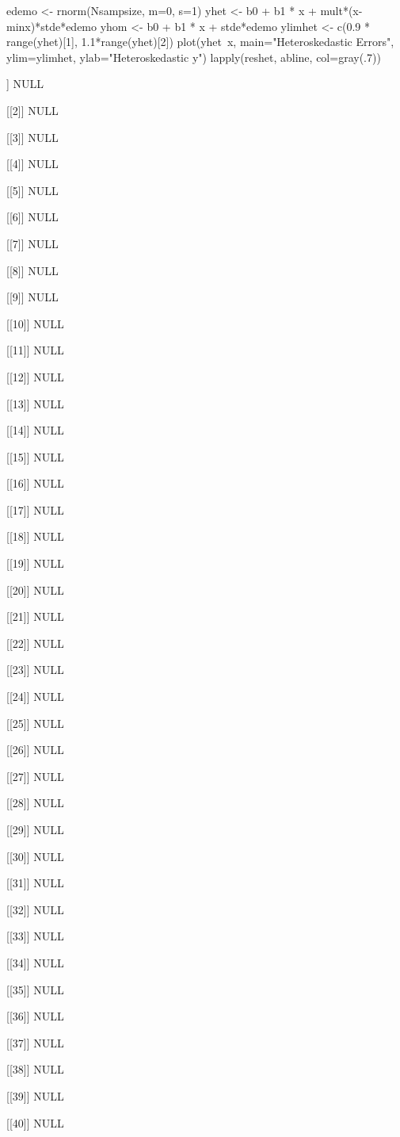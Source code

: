 \begin{Schunk}
\begin{Sinput}
 edemo <- rnorm(Nsampsize, m=0, s=1)
 yhet <- b0 + b1 * x + mult*(x-minx)*stde*edemo
 yhom <- b0 + b1 * x + stde*edemo
 ylimhet <- c(0.9 * range(yhet)[1], 1.1*range(yhet)[2])
 plot(yhet~x, main="Heteroskedastic Errors", ylim=ylimhet, ylab="Heteroskedastic y")
 lapply(reshet, abline, col=gray(.7))
\end{Sinput}
\begin{Soutput}
[[1]]
NULL

[[2]]
NULL

[[3]]
NULL

[[4]]
NULL

[[5]]
NULL

[[6]]
NULL

[[7]]
NULL

[[8]]
NULL

[[9]]
NULL

[[10]]
NULL

[[11]]
NULL

[[12]]
NULL

[[13]]
NULL

[[14]]
NULL

[[15]]
NULL

[[16]]
NULL

[[17]]
NULL

[[18]]
NULL

[[19]]
NULL

[[20]]
NULL

[[21]]
NULL

[[22]]
NULL

[[23]]
NULL

[[24]]
NULL

[[25]]
NULL

[[26]]
NULL

[[27]]
NULL

[[28]]
NULL

[[29]]
NULL

[[30]]
NULL

[[31]]
NULL

[[32]]
NULL

[[33]]
NULL

[[34]]
NULL

[[35]]
NULL

[[36]]
NULL

[[37]]
NULL

[[38]]
NULL

[[39]]
NULL

[[40]]
NULL


\end{Soutput}
\end{Schunk}
